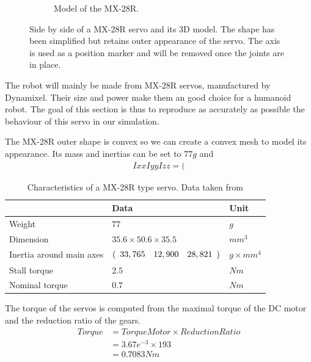 \begin{figure}[htp]
\begin{subfigure}[b]{0.3\textwidth}
    \caption{Model of the MX-28R.}
    \label{fig:mx28_model}
\end{subfigure}
\caption{Side by side of a MX-28R servo and its 3D model. The shape has been simplified but retains outer appearance of the servo. The axis is used as a position marker and will be removed once the joints are in place.}
\label{fig:servo}
\end{figure}

The robot will mainly be made from MX-28R servos, manufactured by Dynamixel. Their size and power make them an good choice for a humanoid robot. The goal of this section is thus to reproduce as accurately as possible the behaviour of this servo in our simulation.

The MX-28R outer shape is convex so we can create a convex mesh to model its appearance. Its mass and inertias can be set to $77g$ and 
\begin{align*}
Ixx Iyy Izz = (
\end{align*}

\begin{table}[htp]
\center
\begin{tabularx}{\textwidth}{@{} l l l @{}}
\toprule
& \textbf{Data} & \textbf{Unit}\\ 
\midrule
Weight & $77$ & $g$\\
Dimension & $35.6 \times 50.6 \times 35.5$ & $mm^3$\\
Inertia around main axes & $(\begin{array}{c c c}
33,765 & 12,900 & 28,821
\end{array})$ & $g \times mm^4$ \\
Stall torque & $2.5$ & $Nm$\\
Nominal torque & $0.7$ & $Nm$\\
\bottomrule
\end{tabularx}
\caption{Characteristics of a MX-28R type servo. Data taken from \cite{mx_28_manual}}
\label{table:specs}
\end{table}

The torque of the servos is computed from the maximal torque of the DC motor and the reduction ratio of the gears. 
\begin{align*}
Torque &= TorqueMotor \times ReductionRatio\\
&= 3.67e^{-3} \times 193\\
&= 0.7083Nm
\end{align*} 

